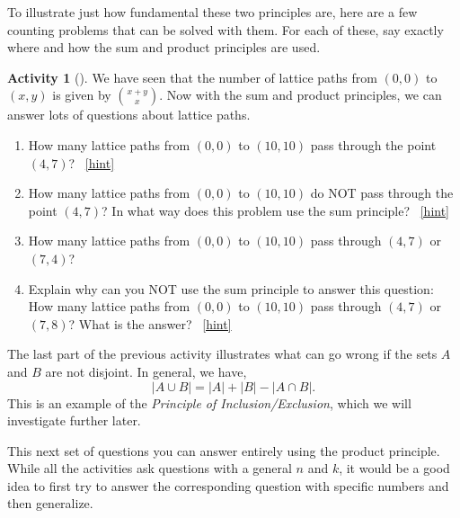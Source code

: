 \documentclass[10pt,]{book}
\theoremstyle{plain}
\theoremstyle{definition}
\theoremstyle{definition}
\theoremstyle{definition}
\newtheorem{activity}[project]{Activity}
\numberwithin{equation}{chapter}
\newcommand{\card}[1]{\left| #1 \right|}
\begin{document}
\hypertarget{p-626}{}%
To illustrate just how fundamental these two principles are, here are a few counting problems that can be solved with them.  For each of these, say exactly where and how the sum and product principles are used.%
\begin{activity}[]\label{act-latticepaths2}
\hypertarget{p-627}{}%
We have seen that the number of lattice paths from \((0,0)\) to \((x,y)\) is given by \(\binom{x+y}{x}\).  Now with the sum and product principles, we can answer lots of questions about lattice paths.%
\begin{enumerate}[font=\bfseries,label=(\alph*),ref=\alph*]
\item\label{task-129} \hypertarget{p-628}{}%
How many lattice paths from \((0,0)\) to \((10,10)\) pass through the point \((4,7)\)?%
~\hfill{\tiny\hyperlink{a-85.a}{[hint]}\hypertarget{q-85.a}{}}\item\label{task-130} \hypertarget{p-630}{}%
How many lattice paths from \((0,0)\) to \((10,10)\) do NOT pass through the point \((4,7)\)?  In what way does this problem use the sum principle?%
~\hfill{\tiny\hyperlink{a-85.b}{[hint]}\hypertarget{q-85.b}{}}\item\label{task-131} \hypertarget{p-632}{}%
How many lattice paths from \((0,0)\) to \((10,10)\) pass through \((4,7)\) or \((7,4)\)?%
\item\label{task-132} \hypertarget{p-633}{}%
Explain why can you NOT use the sum principle to answer this question: How many lattice paths from \((0,0)\) to \((10,10)\) pass through \((4,7)\) or \((7,8)\)?  What is the answer?%
~\hfill{\tiny\hyperlink{a-85.d}{[hint]}\hypertarget{q-85.d}{}}\end{enumerate}
\end{activity}
\hypertarget{p-635}{}%
The last part of the previous activity illustrates what can go wrong if the sets \(A\) and \(B\) are not disjoint.  In general, we have,%
\begin{equation*}
\card{A \cup B} = \card{A} + \card{B} - \card{A \cap B}.
\end{equation*}
This is an example of the \emph{Principle of Inclusion/Exclusion}, which we will investigate further later.%
\par
\hypertarget{p-636}{}%
This next set of questions you can answer entirely using the product principle.  While all the activities ask questions with a general \(n\) and \(k\), it would be a good idea to first try to answer the corresponding question with specific numbers and then generalize.%
\end{document}
